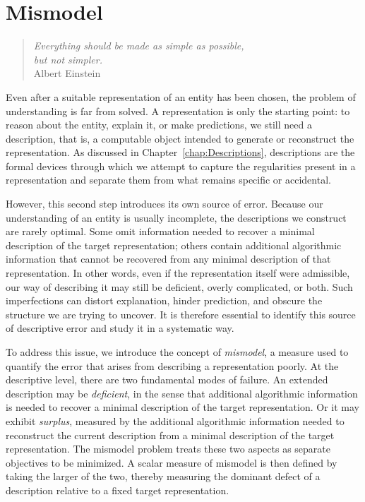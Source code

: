 %
%


\chapter{Mismodel}
\label{chap:Mismodel}

\begin{quote}
\begin{flushright}
\emph{Everything should be made as simple as possible,\\
but not simpler.}\\
Albert Einstein 
\end{flushright}
\end{quote}
\bigskip

Even after a suitable representation of an entity has been chosen, the problem of understanding is far from solved. A representation is only the starting point: to reason about the entity, explain it, or make predictions, we still need a description, that is, a computable object intended to generate or reconstruct the representation. As discussed in Chapter~\ref{chap:Descriptions}, descriptions are the formal devices through which we attempt to capture the regularities present in a representation and separate them from what remains specific or accidental.

However, this second step introduces its own source of error. Because our understanding of an entity is usually incomplete, the descriptions we construct are rarely optimal. Some omit information needed to recover a minimal description of the target representation; others contain additional algorithmic information that cannot be recovered from any minimal description of that representation. In other words, even if the representation itself were admissible, our way of describing it may still be deficient, overly complicated, or both. Such imperfections can distort explanation, hinder prediction, and obscure the structure we are trying to uncover. It is therefore essential to identify this source of descriptive error and study it in a systematic way.

To address this issue, we introduce the concept of \emph{mismodel}, a measure used to quantify the error that arises from describing a representation poorly. At the descriptive level, there are two fundamental modes of failure. An extended description may be \emph{deficient}, in the sense that additional algorithmic information is needed to recover a minimal description of the target representation. Or it may exhibit \emph{surplus}, measured by the additional algorithmic information needed to reconstruct the current description from a minimal description of the target representation. The mismodel problem treats these two aspects as separate objectives to be minimized. A scalar measure of mismodel is then defined by taking the larger of the two, thereby measuring the dominant defect of a description relative to a fixed target representation.

